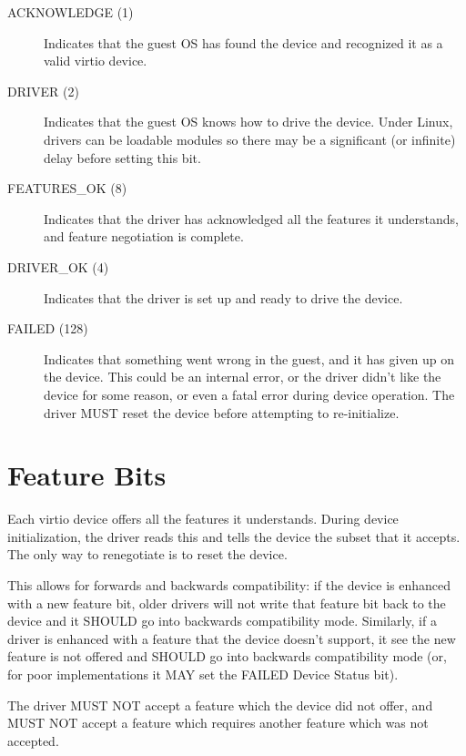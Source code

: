 \begin{description}
\item[ACKNOWLEDGE (1)] Indicates that the guest OS has found the
  device and recognized it as a valid virtio device.

\item[DRIVER (2)] Indicates that the guest OS knows how to drive the
  device. Under Linux, drivers can be loadable modules so there
  may be a significant (or infinite) delay before setting this
  bit.

\item[FEATURES_OK (8)] Indicates that the driver has acknowledged all the
  features it understands, and feature negotiation is complete.

\item[DRIVER_OK (4)] Indicates that the driver is set up and ready to
  drive the device.

\item[FAILED (128)] Indicates that something went wrong in the guest,
  and it has given up on the device. This could be an internal
  error, or the driver didn't like the device for some reason, or
  even a fatal error during device operation. The driver MUST
  reset the device before attempting to re-initialize.
\end{description}

\section{Feature Bits}\label{sec:Basic Facilities of a Virtio Device / Feature Bits}

Each virtio device offers all the features it understands.  During
device initialization, the driver reads this and tells the device the
subset that it accepts.  The only way to renegotiate is to reset
the device.

This allows for forwards and backwards compatibility: if the device is
enhanced with a new feature bit, older drivers will not write that
feature bit back to the device and it SHOULD go into backwards
compatibility mode. Similarly, if a driver is enhanced with a feature
that the device doesn't support, it see the new feature is not offered
and SHOULD go into backwards compatibility mode (or, for poor
implementations it MAY set the FAILED Device Status bit).

The driver MUST NOT accept a feature which the device did not offer,
and MUST NOT accept a feature which requires another feature which was
not accepted.

